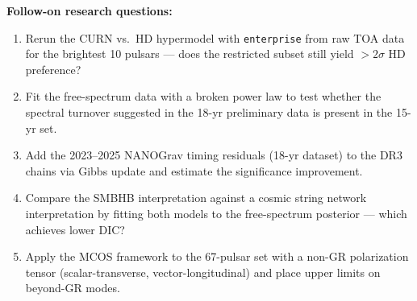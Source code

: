 \documentclass[11pt]{article}
\begin{document}
\noindent\textbf{Follow-on research questions:}
\begin{enumerate}[leftmargin=1.6em,itemsep=0.2em,topsep=0.2em,label=Q\arabic*.]
\item Rerun the CURN vs.\ HD hypermodel with \texttt{enterprise} from raw TOA data for the brightest 10 pulsars --- does the restricted subset still yield $>2\sigma$ HD preference?
\item Fit the free-spectrum data with a broken power law to test whether the spectral turnover suggested in the 18-yr preliminary data is present in the 15-yr set.
\item Add the 2023--2025 NANOGrav timing residuals (18-yr dataset) to the DR3 chains via Gibbs update and estimate the significance improvement.
\item Compare the SMBHB interpretation against a cosmic string network interpretation by fitting both models to the free-spectrum posterior --- which achieves lower DIC?
\item Apply the MCOS framework to the 67-pulsar set with a non-GR polarization tensor (scalar-transverse, vector-longitudinal) and place upper limits on beyond-GR modes.
\end{enumerate}
\end{document}
